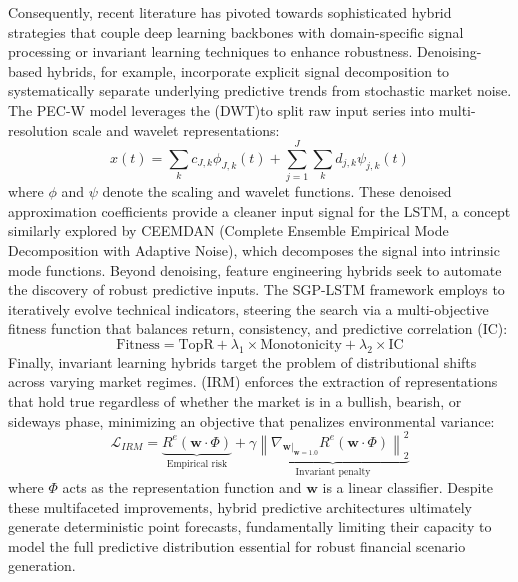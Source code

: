 Consequently, recent literature has pivoted towards sophisticated hybrid strategies that couple deep learning backbones with domain-specific signal processing or invariant learning techniques to enhance robustness. Denoising-based hybrids, for example, incorporate explicit signal decomposition to systematically separate underlying predictive trends from stochastic market noise. The PEC-W model \citep{caliskan2025} leverages the (DWT)to split raw input series into multi-resolution scale and wavelet representations:
\begin{equation}
x(t) = \sum_k c_{J,k} \phi_{J,k}(t) + \sum_{j=1}^J \sum_k d_{j,k} \psi_{j,k}(t)
\end{equation}
where $\phi$ and $\psi$ denote the scaling and wavelet functions. These denoised approximation coefficients provide a cleaner input signal for the LSTM, a concept similarly explored by CEEMDAN (Complete Ensemble Empirical Mode Decomposition with Adaptive Noise)\citep{li2025ceemdan}, which decomposes the signal into intrinsic mode functions. Beyond denoising, feature engineering hybrids seek to automate the discovery of robust predictive inputs. The SGP-LSTM framework \citep{SGP-LSTM1} employs to iteratively evolve technical indicators, steering the search via a multi-objective fitness function that balances return, consistency, and predictive correlation (IC):
\begin{equation}
\text{Fitness} = \text{TopR} + \lambda_1 \times \text{Monotonicity} + \lambda_2 \times \text{IC}
\end{equation}
Finally, invariant learning hybrids target the problem of distributional shifts across varying market regimes. (IRM)\citep{cao2023irm} enforces the extraction of representations that hold true regardless of whether the market is in a bullish, bearish, or sideways phase, minimizing an objective that penalizes environmental variance:
\begin{equation}
\mathcal{L}_{IRM} = \underbrace{R^e(\mathbf{w} \cdot \Phi)}_{\text{Empirical risk}} + \gamma \underbrace{\left\| \nabla_{\mathbf{w}|_{\mathbf{w}=1.0}} R^e(\mathbf{w} \cdot \Phi) \right\|_2^2}_{\text{Invariant penalty}}
\end{equation}
where $\Phi$ acts as the representation function and $\mathbf{w}$ is a linear classifier. Despite these multifaceted improvements, hybrid predictive architectures ultimately generate deterministic point forecasts, fundamentally limiting their capacity to model the full predictive distribution essential for robust financial scenario generation.

